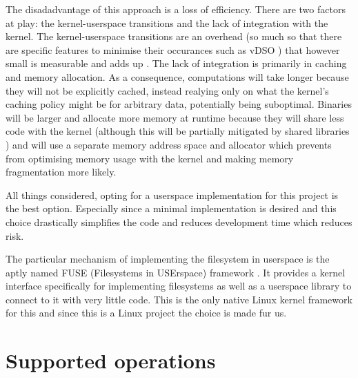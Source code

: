         The disadadvantage of this approach is a loss of efficiency. There are
        two factors at play: the kernel-userspace transitions and the lack of
        integration with the kernel. The kernel-userspace transitions are an
        overhead (so much so that there are specific features to minimise their
        occurances such as vDSO \cite{man_vDSO}) that however small is
        measurable and adds up \cite{Linux_context_switch_overhead}. The lack
        of integration is primarily in caching and memory allocation. As a
        consequence, computations will take longer because they will not be
        explicitly cached, instead realying only on what the kernel's caching
        policy might be for arbitrary data, potentially being suboptimal.
        Binaries will be larger and allocate more memory at runtime because
        they will share less code with the kernel (although this will be
        partially mitigated by shared libraries \cite{shared_libraries}) and
        will use a separate memory address space and allocator which prevents
        from optimising memory usage with the kernel and making memory
        fragmentation more likely.

        All things considered, opting for a userspace implementation for this
        project is the best option. Especially since a minimal implementation
        is desired and this choice drastically simplifies the code and reduces
        development time which reduces risk.

        The particular mechanism of implementing the filesystem in userspace is
        the aptly named FUSE (Filesystems in USErspace) framework \cite{FUSE}.
        It provides a kernel interface specifically for implementing
        filesystems as well as a userspace library to connect to it with very
        little code. This is the only native Linux kernel framework for this
        and since this is a Linux project the choice is made fur us.

    \section{Supported operations}

